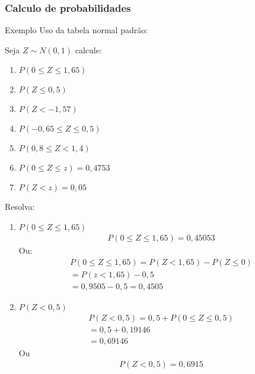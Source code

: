   \subsubsection{Calculo de probabilidades}
  \begin{description}
    \item {Exemplo} Uso da tabela normal padrão:

      Seja $Z\sim N(0,1)$ calcule:
      \begin{enumerate}
        \item $P(0 \leq Z \leq 1,65)$
        \item $P(Z \leq 0,5)$
        \item $P(Z < -1,57)$
        \item $P(-0,65 \leq Z \leq 0,5)$
        \item $P(0,8 \leq Z < 1,4)$
        \item $P(0 \leq Z \leq z)=0,4753$
        \item $P(Z < z)=0,05$
      \end{enumerate}
      
      Resolva:
      \begin{enumerate}
        \item $P(0 \leq Z \leq 1,65)$
        \begin{align*}          P(0 \leq Z \leq 1,65)= 0,45053 \end{align*}
          Ou:
          \begin{align*}
          P(0 \leq Z \leq 1,65)= P(Z < 1,65)-P(Z \leq 0) \\
          = P(z < 1,65)- 0,5 \\
          = 0,9505 - 0,5 = 0,4505
        \end{align*}
      \item $P(Z < 0,5)$
        \begin{align*}
          P(Z < 0,5)= 0,5 + P(0 \leq Z \leq 0,5) \\
          = 0,5 + 0,19146 \\
          = 0,69146
      \end{align*}
      Ou 
      \begin{align*}
        P(Z <0,5) = 0,6915
      \end{align*}


\end{enumerate}
\end{description}
